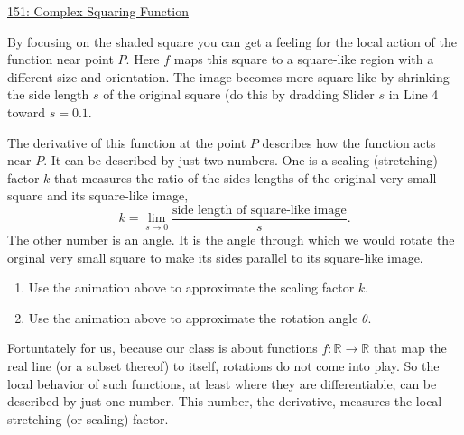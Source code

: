 \documentclass{ximera}
\begin{document}
\begin{onlineOnly}
    \begin{center}
\end{center}
\end{onlineOnly}

\href{https://www.desmos.com/calculator/h4sslgjjyx}{151: Complex Squaring Function}

By focusing on the shaded square you can get a feeling for the local action of the function near point $P$. Here $f$ maps this square to a square-like region with a different size and orientation. The image becomes more square-like by shrinking the side length $s$ of the original square (do this by dradding Slider $s$ in Line 4 toward $s=0.1$.

The derivative of this function at the point $P$ describes how the function acts near $P$. It can be described by just two numbers. One is a scaling (stretching) factor $k$ that measures the ratio of the sides lengths of the original very small square and its square-like image, 
\[
         k = \lim_{s\to 0}\frac{\text{side length of square-like image}}{s} .
\]
The other number is an angle. It is the angle through which we would rotate the orginal very small square to make its sides parallel to its square-like image. 

\begin{question} \label{Q:LDFDFDF}
\begin{enumerate}
\item Use the animation above to approximate the scaling factor $k$.

\item Use the animation above to approximate the rotation angle $\theta$.
\end{enumerate}
\end{question} 

Fortuntately for us, because our class is about functions $f:\mathbb{R}\to \mathbb{R}$ that map the real line (or a subset thereof) to itself, rotations do not come into play. So the local behavior of such functions, at least where they are differentiable, can be described by just one number. This number, the derivative, measures the local stretching (or scaling) factor. 
\end{document}
